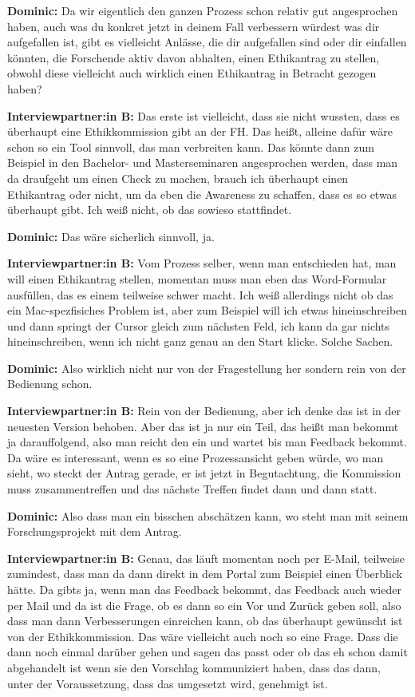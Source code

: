 \documentclass[a4paper,12pt,twoside]{scrreprt}
\begin{document}
\textbf{Dominic:} Da wir eigentlich den ganzen Prozess schon relativ gut angesprochen haben, auch was du konkret jetzt in deinem Fall verbessern würdest was dir aufgefallen ist, gibt es vielleicht Anlässe, die dir aufgefallen sind oder dir einfallen könnten, die Forschende aktiv davon abhalten, einen Ethikantrag zu stellen, obwohl diese vielleicht auch wirklich einen Ethikantrag in Betracht gezogen haben?

\textbf{Interviewpartner:in B:} Das erste ist vielleicht, dass sie nicht wussten, dass es überhaupt eine Ethikkommission gibt an der FH. Das heißt, alleine dafür wäre schon so ein Tool sinnvoll, das man verbreiten kann. Das könnte dann zum Beispiel in den Bachelor- und Masterseminaren angesprochen werden, dass man da draufgeht um einen Check zu machen, brauch ich überhaupt einen Ethikantrag oder nicht, um da eben die Awareness zu schaffen, dass es so etwas überhaupt gibt. Ich weiß nicht, ob das sowieso stattfindet.

\textbf{Dominic:} Das wäre sicherlich sinnvoll, ja.

\textbf{Interviewpartner:in B:} Vom Prozess selber, wenn man entschieden hat, man will einen Ethikantrag stellen, momentan muss man eben das Word-Formular ausfüllen, das es einem teilweise schwer macht. Ich weiß allerdings nicht ob das ein Mac-spezfisiches Problem ist, aber zum Beispiel will ich etwas hineinschreiben und dann springt der Cursor gleich zum nächsten Feld, ich kann da gar nichts hineinschreiben, wenn ich nicht ganz genau an den Start klicke. Solche Sachen.

\textbf{Dominic:} Also wirklich nicht nur von der Fragestellung her sondern rein von der Bedienung schon.

\textbf{Interviewpartner:in B:} Rein von der Bedienung, aber ich denke das ist in der neuesten Version behoben. Aber das ist ja nur ein Teil, das heißt man bekommt ja darauffolgend, also man reicht den ein und wartet bis man Feedback bekommt. Da wäre es interessant, wenn es so eine Prozessansicht geben würde, wo man sieht, wo steckt der Antrag gerade, er ist jetzt in Begutachtung, die Kommission muss zusammentreffen und das nächste Treffen findet dann und dann statt.

\textbf{Dominic:} Also dass man ein bisschen abschätzen kann, wo steht man mit seinem Forschungsprojekt mit dem Antrag.

\textbf{Interviewpartner:in B:} Genau, das läuft momentan noch per E-Mail, teilweise zumindest, dass man da dann direkt in dem Portal zum Beispiel einen Überblick hätte. Da gibts ja, wenn man das Feedback bekommt, das Feedback auch wieder per Mail und da ist die Frage, ob es dann so ein Vor und Zurück geben soll, also dass man dann Verbesserungen einreichen kann, ob das überhaupt gewünscht ist von der Ethikkommission. Das wäre vielleicht auch noch so eine Frage. Dass die dann noch einmal darüber gehen und sagen das passt oder ob das eh schon damit abgehandelt ist wenn sie den Vorschlag kommuniziert haben, dass das dann, unter der Voraussetzung, dass das umgesetzt wird, genehmigt ist.
\end{document}
